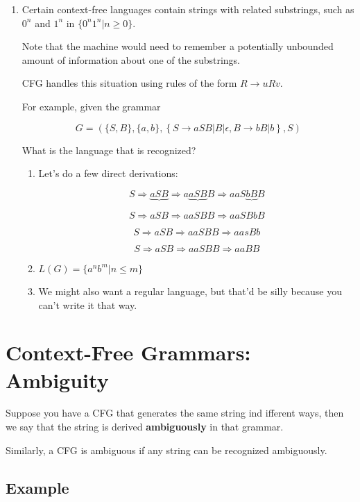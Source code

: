 \documentclass{article}
\begin{document}
\begin{enumerate}
\item Certain context-free languages contain strings with related
  substrings, such as $0^n$ and $1^n$ in $\{0^n1^n|n\ge0\}$.

  Note that the machine would need to remember a potentially unbounded
  amount of information about one of the substrings.

  CFG handles this situation using rules of the form
  $R\rightarrow{}uRv$.

  For example, given the grammar

  \[
  G=\left(\{S,B\},\{a,b\},\left\{S\rightarrow{}aSB|B|\epsilon,B\rightarrow{}bB|b\right\},S\right)
  \]

  What is the language that is recognized?

  \begin{enumerate}[label=(\arabic*)]
  \item Let's do a few direct derivations:

    \[
    \boxed{S}\Rightarrow \underbrace{a\boxed{S}B}\Rightarrow a\underbrace{aS\boxed{B}}B\Rightarrow aaS\underbrace{bB}B
    \]

    \[
    S\Rightarrow aSB\Rightarrow aaSBB\Rightarrow aaSBbB
    \]

    \[
    S\Rightarrow aSB\Rightarrow aaSBB\Rightarrow aasBb
    \]

    \[
    S\Rightarrow aSB\Rightarrow aaSBB\Rightarrow aaBB
    \]

  \item $L(G)=\{a^nb^m|n\le{}m\}$

  \item We might also want a regular language, but that'd be silly
    because you can't write it that way.

  \end{enumerate}
\end{enumerate}

\section*{Context-Free Grammars: Ambiguity}

Suppose you have a CFG that generates the same string ind ifferent
ways, then we say that the string is derived \textbf{ambiguously} in
that grammar.

Similarly, a CFG is ambiguous if any string can be recognized ambiguously.

\subsection*{Example}
\end{document}
